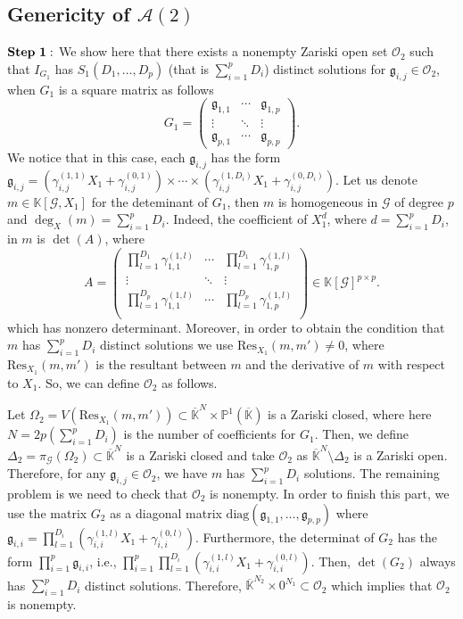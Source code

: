 \documentclass[11pt]{article}
\numberwithin{Property}{section}
\numberwithin{Theorem}{section}
\numberwithin{Proposition}{section}
\numberwithin{Lemma}{section}
\numberwithin{Corollary}{section}
\numberwithin{Definition}{section}
\numberwithin{Remark}{section}
\numberwithin{Conjecture}{section}
\numberwithin{Problem}{section}
\numberwithin{Example}{section}
\numberwithin{Claim}{section}
\def\bar{\overline}
\newcommand{\field}{\mathbb{K}} %
\begin{document}
\subsection{Genericity of $\mathcal{A}(2)$}
$\bf{Step \ 1:}$ We show here that there exists a nonempty Zariski open set $\mathcal{O}_2$ such that $I_{G_1}$ has $S_1(D_1, \ldots, D_p)$ (that is $\sum_{i=1}^pD_i$) distinct solutions for $\mathfrak{g}_{i,j} \in \mathcal{O}_2$, when $G_1$ is a square matrix as follows
\[
G_1 = \left( \begin{matrix}
\mathfrak{g}_{1,1}  & \cdots  & \mathfrak{g}_{1, p}\\
\vdots & \ddots & \vdots \\
\mathfrak{g}_{p,1} & \cdots  & \mathfrak{g}_{p, p}
\end{matrix} \right).
\] We notice that in this case, each $\mathfrak{g}_{i,j}$ has the form $\mathfrak{g}_{i,j} = (\gamma_{i,j}^{(1,1)}X_1 + \gamma_{i,j}^{(0,1)}) \times \cdots \times (\gamma_{i,j}^{(1,D_i)}X_1 + \gamma_{i,j}^{(0,D_i)})$. Let us denote $m \in \field[\mathcal{G}, X_1]$ for the deteminant of $G_1$, then $m$ is homogeneous in $\mathcal{G}$ of degree $p$ and $\deg_X(m) = \sum_{i=1}^pD_i$. Indeed, the coefficient of $X_1^{d}$, where $d = \sum_{i=1}^pD_i$, in $m$ is $\det(A)$, where 
\[
A = \left( \begin{matrix}
\prod_{l=1}^{D_1}\gamma_{1,1}^{(1,l)}  & \cdots  & \prod_{l=1}^{D_1}\gamma_{1,p}^{(1,l)}\\
\vdots & \ddots & \vdots \\
\prod_{l=1}^{D_p}\gamma_{1,1}^{(1,l)}  & \cdots  & \prod_{l=1}^{D_p}\gamma_{1,p}^{(1,l)}\\
\end{matrix} \right) \in \field[\mathcal{G}]^{p \times p}.
\] which has nonzero determinant. Moreover, in order to obtain the condition that $m$ has $\sum_{i=1}^pD_i$ distinct solutions we use $\mathrm{Res}_{X_1}(m, m') \ne 0$, where $\mathrm{Res}_{X_1}(m, m')$ is the resultant between $m$ and the derivative of $m$ with respect to $X_1$. So, we can define $\mathcal{O}_2$ as follows. 

Let $\Omega_2 = V(\mathrm{Res}_{X_1}(m, m')) \subset \bar{\field}^{N} \times \mathbb{P}^1(\bar{\field})$ is a Zariski closed, where here $N = 2p(\sum_{i=1}^pD_i)$ is the number of coefficients for $G_1$. Then, we define $\Delta_2 = \pi_{\mathcal{G}}(\Omega_2) \subset \bar{\field}^{N}$ is a Zariski closed and take $\mathcal{O}_2$ as $\bar{\field}^{N} \setminus \Delta_2$ is a Zariski open. Therefore, for any $\mathfrak{g}_{i,j} \in \mathcal{O}_2$, we have $m$ has $\sum_{i=1}^pD_i$ solutions. The remaining problem is we need to check that $\mathcal{O}_2$ is nonempty. In order to finish this part, we use the matrix $G_2$ as a diagonal matrix $\mathrm{diag}(\mathfrak{g}_{1,1}, \ldots, \mathfrak{g}_{p,p})$ where $\mathfrak{g}_{i,i} = \prod_{l=1}^{D_i}(\gamma_{i,i}^{(1,l)}X_1 + \gamma_{i,i}^{(0,l)})$. Furthermore, the determinat of $G_2$ has the form $\prod_{i=1}^p\mathfrak{g}_{i,i}$, i.e., $\prod_{i=1}^p\prod_{l=1}^{D_i}(\gamma_{i,i}^{(1,l)}X_1 + \gamma_{i,i}^{(0,l)})$. Then, $\det(G_2)$ always has $\sum_{i=1}^pD_i$  distinct solutions. Therefore, $\bar{\field}^{N_2} \times 0^{N_1} \subset \mathcal{O}_2$ which implies that $\mathcal{O}_2$ is nonempty. 
\end{document}
